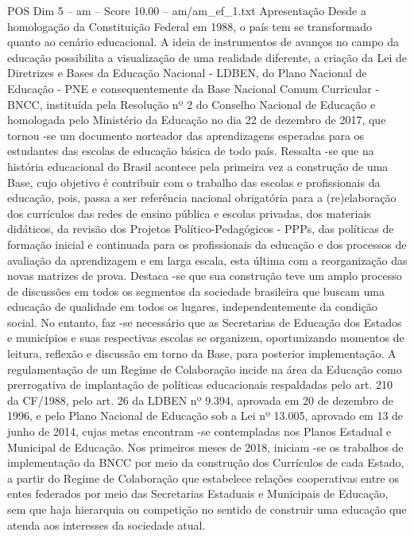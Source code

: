 \begin{textsample}{POS Dim 5 – am – Score 10.00 – am/am\_ef\_1.txt}  \label{ex:f5_pos_063}
Apresentação Desde a homologação da Constituição Federal em 1988, o país tem se transformado quanto ao cenário educacional.
A ideia de instrumentos de avanços no campo da educação possibilita a visualização de uma realidade diferente, a criação da Lei de Diretrizes e Bases da Educação Nacional - LDBEN, do Plano Nacional de Educação - PNE e consequentemente da Base Nacional Comum Curricular - BNCC, instituída pela Resolução nº 2 do Conselho Nacional de Educação e homologada pelo Ministério da Educação no dia 22 de dezembro de 2017, que tornou -se um documento norteador das aprendizagens esperadas para os estudantes das escolas de educação básica de todo país.
Ressalta -se que na história educacional do Brasil acontece pela primeira vez a construção de uma Base, cujo objetivo é contribuir com o trabalho das escolas e profissionais da educação, pois, passa a ser referência nacional obrigatória para a (re)elaboração dos currículos das redes de ensino pública e escolas privadas, dos materiais didáticos, da revisão dos Projetos Político-Pedagógicos - PPPs, das políticas de formação inicial e continuada para os profissionais da educação e dos processos de avaliação da aprendizagem e em larga escala, esta última com a reorganização das novas matrizes de prova.
Destaca -se que sua construção teve um amplo processo de discussões em todos os segmentos da sociedade brasileira que buscam uma educação de qualidade em todos os lugares, independentemente da condição social.
No entanto, faz -se necessário que as Secretarias de Educação dos Estados e municípios e suas respectivas escolas se organizem, oportunizando momentos de leitura, reflexão e discussão em torno da Base, para posterior implementação.
A regulamentação de um Regime de Colaboração incide na área da Educação como prerrogativa de implantação de políticas educacionais respaldadas pelo art. 210 da CF/1988, pelo art. 26 da LDBEN nº 9.394, aprovada em 20 de dezembro de 1996, e pelo Plano Nacional de Educação sob a Lei nº 13.005, aprovado em 13 de junho de 2014, cujas metas encontram -se contempladas nos Planos Estadual e Municipal de Educação.
Nos primeiros meses de 2018, iniciam -se os trabalhos de implementação da BNCC por meio da construção dos Currículos de cada Estado, a partir do Regime de Colaboração que estabelece relações cooperativas entre os entes federados por meio das Secretarias Estaduais e Municipais de Educação, sem que haja hierarquia ou competição no sentido de construir uma educação que atenda aos interesses da sociedade atual.

\end{textsample}
